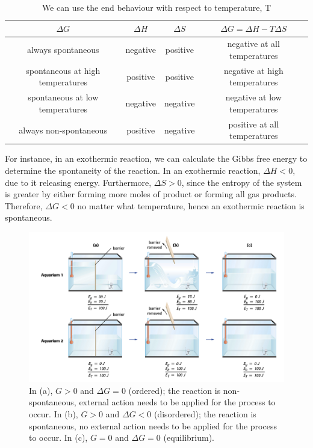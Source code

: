 \begin{table}[!ht]
    \centering
    \caption{We can use the end behaviour with respect to temperature, T}
    \setlength{\tabcolsep}{12pt}      %
    \renewcommand{\arraystretch}{1.2} %
    \begin{tabular}{|c|c|c|c|}
        \hline
        \rowcolor{HeaderColor}
        $\Delta G$ & $\Delta H$ & $\Delta S$ & $\Delta G=\Delta H-T\Delta S$ \\ \hline
        always spontaneous & negative & positive & negative at all temperatures \\ \hline
        spontaneous at high temperatures & positive & positive & negative at high temperatures \\ \hline
        spontaneous at low temperatures & negative & negative & negative at low temperatures \\ \hline
        always non-spontaneous & positive & negative & positive at all temperatures \\ \hline
    \end{tabular}
\end{table}

For instance, in an exothermic reaction, we can calculate the Gibbs free energy to determine the
spontaneity of the reaction. In an exothermic reaction, $\Delta H<0$, due to it releasing energy.
Furthermore, $\Delta S>0$, since the entropy of the system is greater by either forming more
moles of product or forming all gas products. Therefore, $\Delta G<0$ no matter what temperature,
hence an exothermic reaction is spontaneous.

\begin{figure}[ht!]
    \centering
    \includegraphics[width=0.8 \textwidth]{../figures/aquarium-analogy.png}
    \caption{In (a), $G>0$ and $\Delta G=0$ (ordered); the reaction is non-spontaneous, external 
        action needs to be applied for the process to occur. In (b), $G>0$ and $\Delta G<0$ 
        (disordered); the reaction is spontaneous, no external action needs to be applied for
        the process to occur. In (c), $G=0$ and $\Delta G=0$ (equilibrium).}
    \label{fig:aquarium-analogy}
\end{figure}

